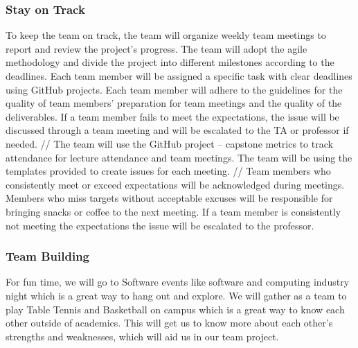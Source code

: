 \documentclass{article}
\begin{document}
\subsubsection*{Stay on Track}
To keep the team on track, the team will organize weekly team meetings to report and review the project’s progress. The team will adopt the agile methodology and divide the project into different milestones according to the deadlines. Each team member will be assigned a specific task with clear deadlines using GitHub projects. Each team member will adhere to the guidelines for the quality of team members’ preparation for team meetings and the quality of the deliverables. If a team member fails to meet the expectations, the issue will be discussed through a team meeting and will be escalated to the TA or professor if needed. // 
The team will use the GitHub project – capstone metrics to track attendance for lecture attendance and team meetings. The team will be using the templates provided to create issues for each meeting. // 
Team members who consistently meet or exceed expectations will be acknowledged during meetings. Members who miss targets without acceptable excuses will be responsible for bringing snacks or coffee to the next meeting. If a team member is consistently not meeting the expectations the issue will be escalated to the professor.

\subsubsection*{Team Building}
For fun time, we will go to Software events like software and computing industry night which is a great way to hang out and explore. We will gather as a team to play Table Tennis and Basketball on campus which is a great way to know each other outside of academics. This will get us to know more about each other’s strengths and weaknesses, which will aid us in our team project.
\end{document}

